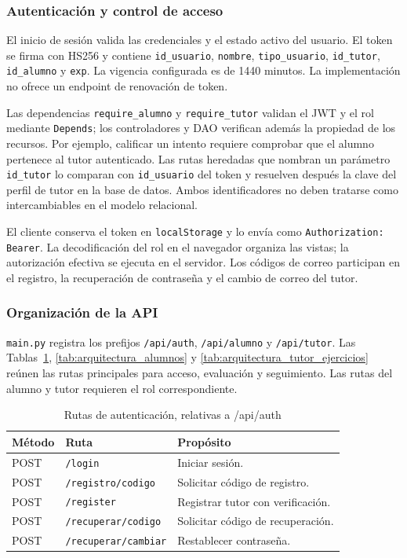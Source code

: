 \subsubsection{Autenticación y control de acceso}
El inicio de sesión valida las credenciales y el estado activo del usuario. El token se firma con HS256 y contiene \texttt{id\_usuario}, \texttt{nombre}, \texttt{tipo\_usuario}, \texttt{id\_tutor}, \texttt{id\_alumno} y \texttt{exp}. La vigencia configurada es de 1440 minutos. La implementación no ofrece un endpoint de renovación de token.

Las dependencias \texttt{require\_alumno} y \texttt{require\_tutor} validan el JWT y el rol mediante \texttt{Depends}; los controladores y DAO verifican además la propiedad de los recursos. Por ejemplo, calificar un intento requiere comprobar que el alumno pertenece al tutor autenticado. Las rutas heredadas que nombran un parámetro \texttt{id\_tutor} lo comparan con \texttt{id\_usuario} del token y resuelven después la clave del perfil de tutor en la base de datos. Ambos identificadores no deben tratarse como intercambiables en el modelo relacional.

El cliente conserva el token en \texttt{localStorage} y lo envía como \texttt{Authorization: Bearer}. La decodificación del rol en el navegador organiza las vistas; la autorización efectiva se ejecuta en el servidor. Los códigos de correo participan en el registro, la recuperación de contraseña y el cambio de correo del tutor.

\subsubsection{Organización de la API}
\texttt{main.py} registra los prefijos \texttt{/api/auth}, \texttt{/api/alumno} y \texttt{/api/tutor}. Las Tablas~\ref{tab:arquitectura_auth}, \ref{tab:arquitectura_alumnos} y \ref{tab:arquitectura_tutor_ejercicios} reúnen las rutas principales para acceso, evaluación y seguimiento. Las rutas del alumno y tutor requieren el rol correspondiente.

\begin{longtable}{p{1.7cm}p{7.1cm}p{5.4cm}}
\caption{Rutas de autenticación, relativas a /api/auth}\label{tab:arquitectura_auth}\\
\toprule Método & Ruta & Propósito \\ \midrule
POST & \texttt{/login} & Iniciar sesión. \\
POST & \texttt{/registro/codigo} & Solicitar código de registro. \\
POST & \texttt{/register} & Registrar tutor con verificación. \\
POST & \texttt{/recuperar/codigo} & Solicitar código de recuperación. \\
POST & \texttt{/recuperar/cambiar} & Restablecer contraseña. \\
\bottomrule
\end{longtable}

